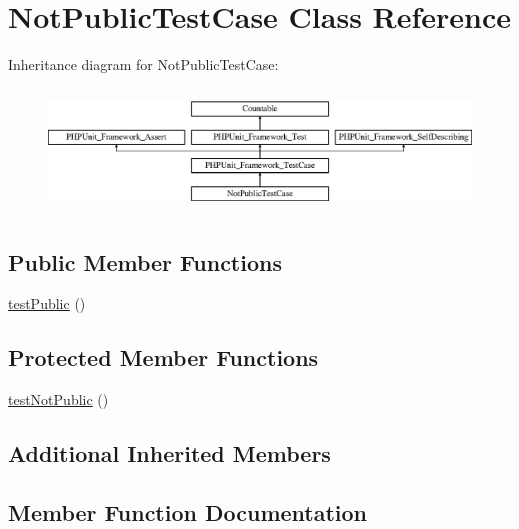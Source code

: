 \hypertarget{class_not_public_test_case}{}\section{Not\+Public\+Test\+Case Class Reference}
\label{class_not_public_test_case}
Inheritance diagram for Not\+Public\+Test\+Case\+:\begin{figure}[H]
\begin{center}
\leavevmode
\includegraphics[height=3.303835cm]{class_not_public_test_case}
\end{center}
\end{figure}
\subsection*{Public Member Functions}
\begin{DoxyCompactItemize}
\item 
\mbox{\hyperlink{class_not_public_test_case_a5f09a836d15014038b762bf8d62c156a}{test\+Public}} ()
\end{DoxyCompactItemize}
\subsection*{Protected Member Functions}
\begin{DoxyCompactItemize}
\item 
\mbox{\hyperlink{class_not_public_test_case_aa86f5f0bbcdda3817bb3ae4c7109e281}{test\+Not\+Public}} ()
\end{DoxyCompactItemize}
\subsection*{Additional Inherited Members}


\subsection{Member Function Documentation}
\mbox{\label{class_not_public_test_case_aa86f5f0bbcdda3817bb3ae4c7109e281}} 
